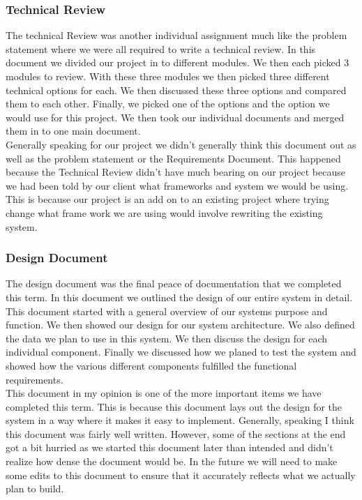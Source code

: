 \documentclass[onecolumn, draftclsnofoot,10pt, compsoc]{article}
\begin{document}
	    \subsubsection{Technical Review}
	        The technical Review was another individual assignment much like the problem statement where we were all required to write a technical review. In this document we divided our project in to different modules. We then each picked 3 modules to review. With these three modules we then picked three different technical options for each. We then discussed these three options and compared them to each other. Finally, we picked one of the options and the option we would use for this project. We then took our individual documents and merged them in to one main document.\\
	        
	        Generally speaking for our project we didn't generally think this document out as well as the problem statement or the Requirements Document. This happened because the Technical Review didn't have much bearing on our project because we had been told by our client what frameworks and system we would be using. This is because our project is an add on to an existing project where trying change what frame work we are using would involve rewriting the existing system.\\
	        
	    \subsubsection{Design Document}
	        The design document was the final peace of documentation that we completed this term. In this document we outlined the design of our entire system in detail. This document started with a general overview of our systems purpose and function. We then showed our design for our system architecture. We also defined the data we plan to use in this system. We then discuss the design for each individual component. Finally we discussed how we planed to test the system and showed how the various different components fulfilled the functional requirements.\\
	        
	        This document in my opinion is one of the more important items we have completed this term. This is because this document lays out the design for the system in a way where it makes it easy to implement. Generally, speaking I think this document was fairly well written. However, some of the sections at the end got a bit hurried as we started this document later than intended and didn't realize how dense the document would be. In the future we will need to make some edits to this document to ensure that it accurately reflects what we actually plan to build.\\
	        
\end{document}
